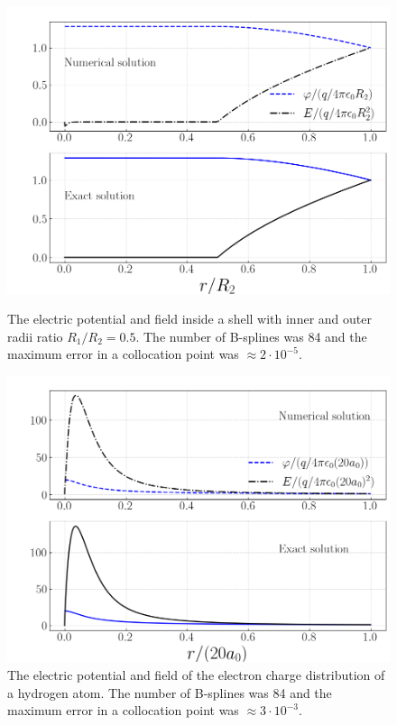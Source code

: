 \documentclass[twocolumn]{article}
\begin{document}
\begin{large}
\begin{figure}[t!]
    \includegraphics[scale=0.35]{Shell_EPhi.png}
    \caption{The electric potential and field inside a shell with inner and outer radii ratio $R_1/R_2=0.5$. The number of B-splines was 84 and the maximum error in a collocation point was $\approx 2\cdot 10^{-5}$.}
    \label{17apr0950}
    \includegraphics[scale=0.35]{Hydrogen_EPhi.png}
    \caption{The electric potential and field of the electron charge distribution of a hydrogen atom. The number of B-splines was 84 and the maximum error in a collocation point was $\approx 3\cdot 10^{-3}$.}
    \label{17apr0959}

\end{figure}
\end{large}
\end{document}
